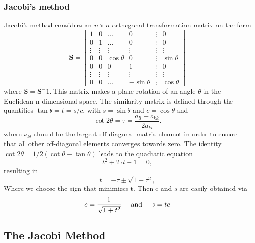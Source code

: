 \documentclass[%
reprint,
amsmath,amssymb,
aps,
]{revtex4-1}
\begin{document}
\subsubsection*{Jacobi's method}  \noindent 
Jacobi's method considers an $n\times n$ orthogonal transformation matrix on the form 
\begin{equation*}
\mathbf{S} = \begin{bmatrix}
1 & 0  & \dots & 0 &\vdots &0 \\
0 & 1  & \dots & 0 & \vdots & 0 \\
\vdots & \vdots &\vdots&\vdots&\vdots&\vdots\\
0 & 0 & \cos{\theta} & 0 &\vdots & \sin{\theta} \\
0  & 0 & 0 & 1 &\vdots & 0 \\
 \vdots & \vdots &\vdots&\vdots&\vdots&\vdots\\
 0 & 0 &\dots & -\sin{\theta} & \vdots & \cos{\theta}
\end{bmatrix}
\end{equation*}
where $\mathbf{S} = \mathbf{S}^-1$. This matrix makes a plane rotation of an angle $\theta$ in the Euclidean n-dimensional space. The similarity matrix is defined through the quantities $\tan\theta = t= s/c$, with $s=\sin\theta$ and $c=\cos\theta$ and
\begin{equation*}\cot 2\theta=\tau = \frac{a_{ll}-a_{kk}}{2a_{kl}}.
\end{equation*}
where $a_{kl}$ should be the largest off-diagonal matrix element in order to ensure that all other off-diagonal elements converges towards zero. The identity $\cot 2\theta=1/2(\cot \theta-\tan\theta)$ leads to the quadratic equation
\begin{equation*}
t^2+2\tau t-1= 0,
\end{equation*}
resulting in
\begin{equation*}
t = -\tau \pm \sqrt{1+\tau^2},
\end{equation*}
Where we choose the sign that minimizes t. Then $c$ and $s$ are easily obtained via
\begin{equation}\label{sc}
c = \frac{1}{\sqrt{1+t^2}} \hspace{5mm}  \textnormal{and} \hspace{5mm} s=tc
\end{equation}  

\subsection{The Jacobi Method}
\end{document}
